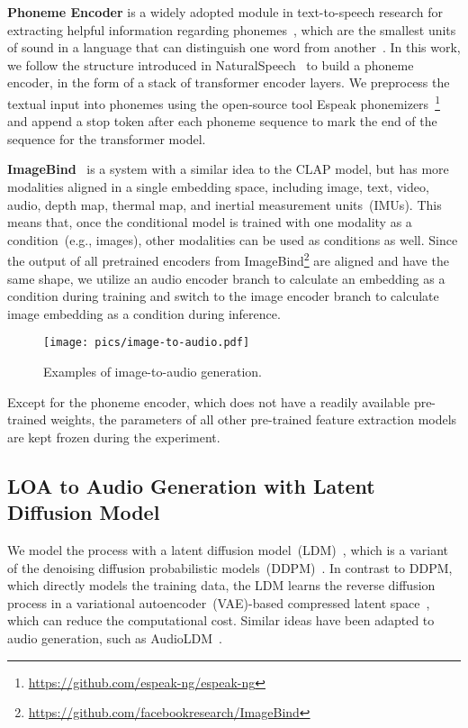 \documentclass[lettersize,journal]{IEEEtran}
\begin{document}
\noindent
\textbf{Phoneme Encoder} is a widely adopted module in text-to-speech research for extracting helpful information regarding phonemes~\cite{Fastspeech2, tan2022naturalspeech}, which are the smallest units of sound in a language that can distinguish one word from another~\cite{tan2023neural}. In this work, we follow the structure introduced in NaturalSpeech~\cite{tan2022naturalspeech} to build a phoneme encoder, in the form of a stack of transformer encoder layers. We preprocess the textual input into phonemes using the open-source tool Espeak phonemizers~\footnote{\url{https://github.com/espeak-ng/espeak-ng}} and append a stop token after each phoneme sequence to mark the end of the sequence for the transformer model. 

\noindent
\textbf{ImageBind}~\cite{girdhar2023imagebind} is a system with a similar idea to the CLAP model, but has more modalities aligned in a single embedding space, including image, text, video, audio, depth map, thermal map, and inertial measurement units~(IMUs). This means that, once the conditional model is trained with one modality as a condition~(e.g., images), other modalities can be used as conditions as well. Since the output of all pretrained encoders from ImageBind\footnote{\url{https://github.com/facebookresearch/ImageBind}} are aligned and have the same shape, we utilize an audio encoder branch to calculate an embedding as a condition during training and switch to the image encoder branch to calculate image embedding as a condition during inference.

\begin{figure}
    \centering
    \texttt{[image: pics/image-to-audio.pdf]}
    \caption{Examples of image-to-audio generation.}
    \label{fig: example-image-to-audio}
\end{figure}



Except for the phoneme encoder, which does not have a readily available pre-trained weights, the parameters of all other pre-trained feature extraction models are kept frozen during the experiment.

\subsection{LOA to Audio Generation with Latent Diffusion Model} 
\label{sec: latent-diffusion-model}

\noindent
We model the process  with a latent diffusion model~(LDM)~\cite{rombach2022high-stablediffusion}, which is a variant of the denoising diffusion probabilistic models~(DDPM)~\cite{DDPM}. In contrast to DDPM, which directly models the training data, the LDM learns the reverse diffusion process in a variational autoencoder~(VAE)-based compressed latent space~\cite{kingma2013auto}, which can reduce the computational cost. Similar ideas have been adapted to audio generation, such as AudioLDM~\cite{liu2023audioldm}.
\end{document}
